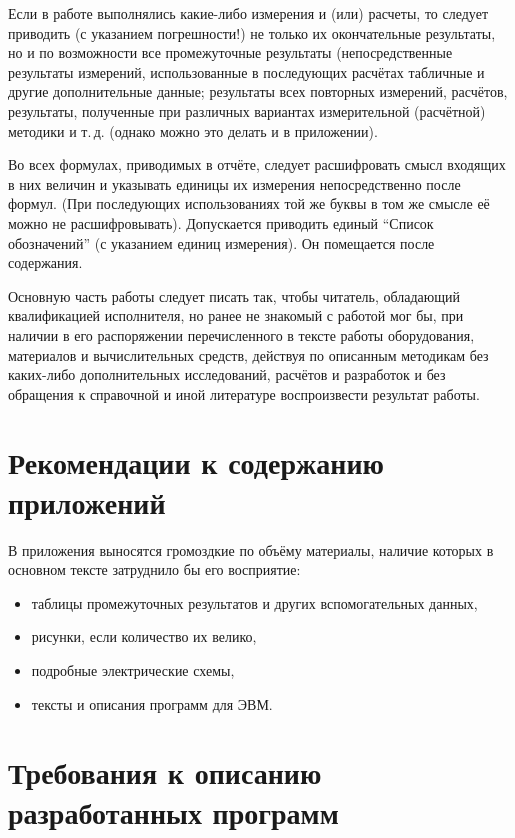 \documentclass[utf8,14pt, coursreport]{G7-32}
\begin{document}
Если в работе выполнялись какие-либо измерения и (или) расчеты, то следует приводить (с указанием погрешности!) не только их окончательные результаты, но и по возможности все промежуточные результаты (непосредственные результаты измерений, использованные в последующих расчётах табличные и другие дополнительные данные; результаты всех повторных измерений, расчётов, результаты, полученные при различных вариантах измерительной (расчётной) методики и т.\,д. (однако можно это делать и в приложении).

Во всех формулах, приводимых в отчёте, следует расшифровать смысл входящих в них величин и указывать единицы их измерения непосредственно после формул. (При последующих использованиях той же буквы в том же смысле её можно не расшифровывать). Допускается приводить единый ``Список обозначений'' (с указанием единиц измерения). Он помещается после содержания.

Основную часть работы следует писать так, чтобы читатель, обладающий квалификацией исполнителя, но ранее не знакомый с работой мог бы, при наличии в его распоряжении перечисленного в тексте работы оборудования, материалов и вычислительных средств, действуя по описанным методикам без каких-либо дополнительных исследований, расчётов и разработок и без обращения к справочной и иной литературе воспроизвести результат работы.

\section{Рекомендации к содержанию приложений}

В приложения выносятся громоздкие по объёму материалы, наличие которых в основном тексте затруднило бы его восприятие:
\begin{itemize}
\item таблицы промежуточных результатов и других вспомогательных данных,
\item рисунки, если количество их велико,
\item подробные электрические схемы,
\item тексты и описания программ для ЭВМ.
\end{itemize}

\section{Требования к описанию разработанных программ}
\end{document}
